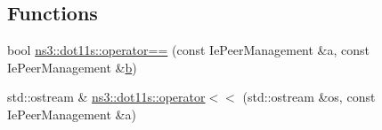 \subsection*{Functions}
\begin{DoxyCompactItemize}
\item 
bool \hyperlink{namespacens3_1_1dot11s_a61409b652bdbb029d73d8f91109cf72d}{ns3\+::dot11s\+::operator==} (const Ie\+Peer\+Management \&a, const Ie\+Peer\+Management \&\hyperlink{lte__pathloss_8m_a21ad0bd836b90d08f4cf640b4c298e7c}{b})
\item 
std\+::ostream \& \hyperlink{namespacens3_1_1dot11s_a89ba4dd621cbd226af1aa1fc2c66c15a}{ns3\+::dot11s\+::operator$<$$<$} (std\+::ostream \&os, const Ie\+Peer\+Management \&a)
\end{DoxyCompactItemize}
